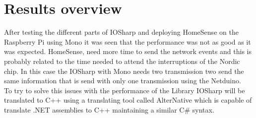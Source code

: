 \section{Results overview}\label{S:Results-overview}
After testing the different parts of IOSharp and deploying HomeSense on the Raspberry Pi using Mono it was seen that the performance was not as good as it was expected. HomeSense, need more time to send the network events and this is probably related to the time needed to attend the interruptions of the Nordic chip. In this case the IOSharp with Mono needs two transmission two send the same information that is send with only one transmission using the Netduino.
\\
To try to solve this issues with the performance of the Library IOSharp will be translated to C++ using a translating tool called AlterNative which is capable of translate .NET assemblies to C++ maintaining a similar C\# syntax.